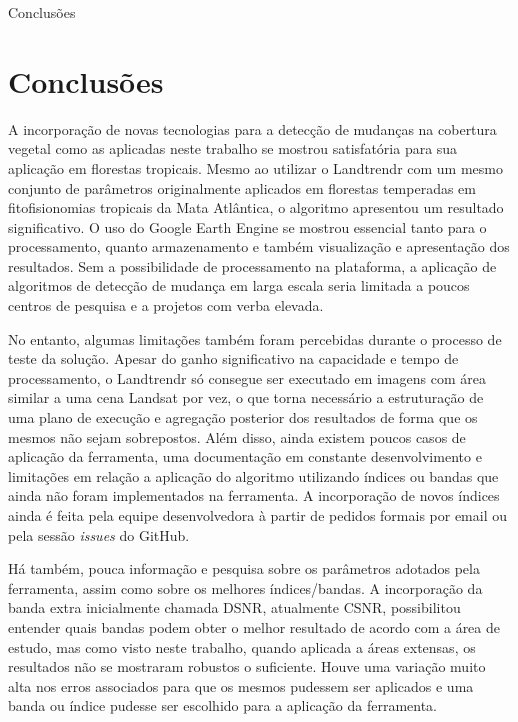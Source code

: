 \begin{titlepage}
    \centering
    \vspace*{\fill}

    \vspace*{0.5cm}

    \Large%
    Conclusões

    \vspace*{5cm}


    \vspace*{\fill}
\end{titlepage}

\section{Conclusões}

\hspace{13pt} A incorporação de novas tecnologias para a detecção de mudanças na cobertura vegetal como as aplicadas neste trabalho se mostrou satisfatória para sua aplicação em florestas tropicais. Mesmo ao utilizar o Landtrendr com um mesmo conjunto de parâmetros originalmente aplicados em florestas temperadas em fitofisionomias tropicais da Mata Atlântica, o algoritmo apresentou um resultado significativo. O uso do Google Earth Engine se mostrou essencial tanto para o processamento, quanto armazenamento e também visualização e apresentação dos resultados. Sem a possibilidade de processamento na plataforma, a aplicação de algoritmos de detecção de mudança em larga escala seria limitada a poucos centros de pesquisa e a projetos com verba elevada.

No entanto, algumas limitações também foram percebidas durante o processo de teste da solução. Apesar do ganho significativo na capacidade e tempo de processamento, o Landtrendr só consegue ser executado em imagens com área similar a uma cena Landsat por vez, o que torna necessário a estruturação de uma plano de execução e agregação posterior dos resultados de forma que os mesmos não sejam sobrepostos. Além disso, ainda existem poucos casos de aplicação da ferramenta, uma documentação em constante desenvolvimento e limitações em relação a aplicação do algoritmo utilizando índices ou bandas que ainda não foram implementados na ferramenta. A incorporação de novos índices ainda é feita pela equipe desenvolvedora à partir de pedidos formais por email ou pela sessão \textit{issues} do GitHub. 

Há também, pouca informação e pesquisa sobre os parâmetros adotados pela ferramenta, assim como sobre os melhores índices/bandas. A incorporação da banda extra inicialmente chamada DSNR, atualmente CSNR, possibilitou entender quais bandas podem obter o melhor resultado de acordo com a área de estudo, mas como visto neste trabalho, quando aplicada a áreas extensas, os resultados não se mostraram robustos o suficiente. Houve uma variação muito alta nos erros associados para que os mesmos pudessem ser aplicados e uma banda ou índice pudesse ser escolhido para a aplicação da ferramenta.

